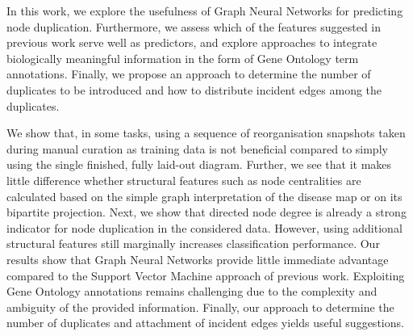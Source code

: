 \documentclass[
	fontsize=10pt, %
	twoside=true, %
	secnumdepth=1, %
  toc=indentunnumbered %
]{kaobook}
\begin{document}
In this work, we explore the usefulness of Graph Neural Networks for
predicting node duplication.
%
Furthermore, we assess which
of the features suggested in previous work
serve well as predictors,
%
and explore approaches to integrate biologically meaningful information in the
form of Gene Ontology term annotations.
%
%
Finally, we propose an approach to determine
the number of duplicates to be introduced and how to distribute incident edges
among the duplicates.

%
We show that, in some tasks, using a sequence of reorganisation
snapshots taken during manual curation as training data is not beneficial
compared to simply using the single finished, fully laid-out diagram.
%
Further, we see that it makes little difference whether structural features such as node
centralities are calculated based on the simple graph interpretation of the
disease map or on its bipartite projection.
%
Next, we show that directed node degree is already a strong indicator for
node duplication in the considered data. However, using additional structural
features still marginally increases classification performance.
%
Our results show that Graph Neural Networks provide little immediate advantage compared to the
Support Vector Machine approach of previous work. 
%
Exploiting Gene Ontology annotations remains challenging due to the complexity
and ambiguity of the provided information.
%
Finally, our approach to determine the number of duplicates and attachment of incident
edges yields useful suggestions.




\end{document}
